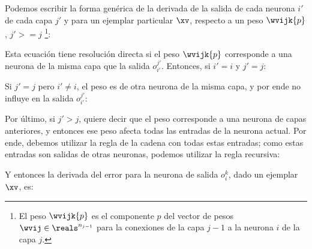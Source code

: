 Podemos escribir la forma genérica de la derivada de la salida de cada neurona $i'$ de cada capa $j'$ y para un ejemplar particular $\xv$, respecto a un peso $\wvijk{p}$, $j'>=j$ \footnote{El peso $\wvijk{p}$ es el componente $p$ del vector de pesos $\wvij \in \reals^{n_{j-1}}$ para la conexiones de la capa $j-1$ a la neurona $i$ de la capa $j$.}:



Esta ecuación tiene resolución directa si el peso $\wvijk{p}$ corresponde a una neurona de la misma capa que la salida $o_{i'}^{j'}$. Entonces, si $i'=i$ y $j'=j$:



Si $j'=j$ pero $i' \neq i$, el peso es de otra neurona de la misma capa, y por ende no influye en la salida  $o_{i'}^{j'}$:




Por último, si $j'>j$, quiere decir que el peso corresponde a una neurona de capas anteriores, y entonces ese peso afecta todas las entradas de la neurona actual. Por ende, debemos utilizar la regla de la cadena con todas estas entradas; como estas entradas son salidas de otras neuronas, podemos utilizar la regla recursiva: 
 
 
 
Y entonces la derivada del error para la neurona de salida $o_i^k$, dado un ejemplar $\xv$, es:

